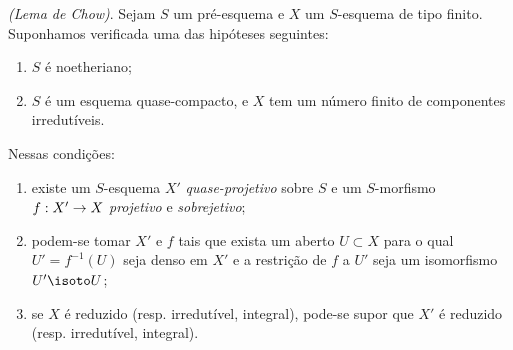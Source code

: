 \documentclass[oneside,10pt]{amsart}
\makeatletter
\newcommand{\ega@arrow}[2]{\mathchoice{#1}{#2}{#2}{#2}}
\renewcommand{\to}{\ega@arrow{\longrightarrow}{\rightarrow}}
\let\EGAOriginalLabel\label
\renewcommand{\label}[1]{\phantomsection\EGAOriginalLabel{#1}}
\makeatother
\begin{document}
\begin{theorem}[5.6.1]
\label{II.5.6.1}
\emph{(Lema de Chow)}.
Sejam $S$ um pré-esquema e $X$ um $S$-esquema de tipo finito.
Suponhamos verificada uma das hipóteses seguintes:
\begin{enumerate}
  \item[\rm{(a)}] $S$ é noetheriano;
  \item[\rm{(b)}] $S$ é um esquema quase-compacto, e $X$ tem um número finito de componentes irredutíveis.
\end{enumerate}
Nessas condições:
\begin{enumerate}
  \item[\rm{(i)}] existe um $S$-esquema $X'$ \emph{quase-projetivo} sobre $S$ e um $S$-morfismo $f:X'\to X$ \emph{projetivo} e \emph{sobrejetivo};
  \item[\rm{(ii)}] podem-se tomar $X'$ e $f$ tais que exista um aberto $U\subset X$ para o qual $U'=f^{-1}(U)$ seja denso em $X'$ e a restrição de $f$ a $U'$ seja um isomorfismo $U'\isoto U$;
  \item[\rm{(iii)}] se $X$ é reduzido (resp. irredutível, integral), pode-se supor que $X'$ é reduzido (resp. irredutível, integral).
\end{enumerate}
\end{theorem}
\end{document}
